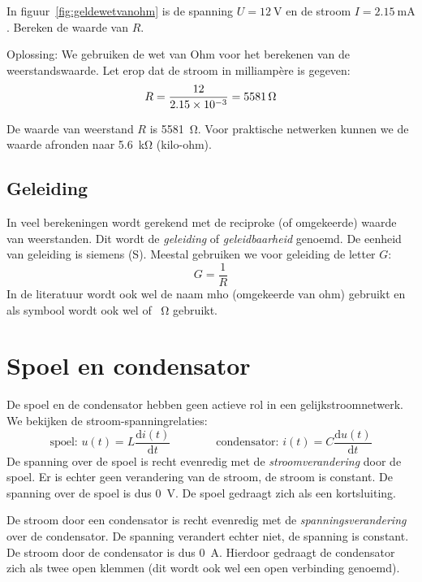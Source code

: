 \begin{example}
In figuur~\ref{fig:geldewetvanohm} is de spanning $U=\SI{12}{\volt}$ en de stroom $I=\SI{2.15}{\milli\ampere}$.
Bereken de waarde van $R$.

Oplossing: We gebruiken de wet van Ohm voor het berekenen van de weerstandswaarde. Let erop dat de stroom in milliampère is gegeven:
\begin{equation}
R = \dfrac{12}{\num{2.15d-3}} = \SI{5581}{\ohm} 
\end{equation}

De waarde van weerstand $R$ is \SI{5581}{\ohm}. Voor praktische netwerken kunnen we de waarde afronden
naar \SI{5.6}{\kilo\ohm} (kilo-ohm).
\end{example}

\subsection{Geleiding}
\label{sec:gelgeleiding}
In veel berekeningen wordt gerekend met de reciproke (of omgekeerde) waarde van weerstanden. Dit wordt
de \textsl{geleiding} of \textsl{geleidbaarheid} genoemd. De eenheid van geleiding is siemens (\si{\siemens}).
Meestal gebruiken we voor geleiding de letter $G$:
\begin{equation}
\label{equ:geleiding}
G = \dfrac{1}{R}
\end{equation}
In de literatuur wordt ook wel de naam mho (omgekeerde van ohm) gebruikt en als symbool wordt ook wel \si{\mho} of \si{\per\ohm} gebruikt.


\section{Spoel en condensator}
De spoel en de condensator hebben geen actieve rol in een gelijkstroomnetwerk. We bekijken de stroom-spanningrelaties:
%
\begin{equation}
\text{spoel: } u(t) = L\dfrac{\mathrm{d}i(t)}{\mathrm{d}t} \qquad\qquad \text{condensator: } i(t) = C\dfrac{\mathrm{d}u(t)}{\mathrm{d}t}
\end{equation}
%
De spanning over de spoel is recht evenredig met de \textsl{stroomverandering} door de spoel. Er is echter geen verandering van de stroom, de stroom is constant. De spanning over de spoel is dus \SI{0}{\volt}. De spoel gedraagt zich als een kortsluiting.

De stroom door een condensator is recht evenredig met de \textsl{spanningsverandering} over de condensator. De spanning verandert echter niet, de spanning is constant. De stroom door de condensator is dus \SI{0}{\ampere}. Hierdoor gedraagt de condensator zich als twee open klemmen (dit wordt ook wel een open verbinding genoemd).


